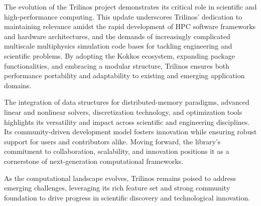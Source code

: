 
The evolution of the Trilinos project demonstrates its critical role in scientific and high-performance computing.
This update underscores Trilinos' dedication to maintaining relevance amidst the rapid development of HPC software frameworks and hardware architectures, and the demands of increasingly complicated multiscale multiphysics simulation code bases for tackling engineering and scientific problems.
By adopting the Kokkos ecosystem, expanding package functionalities, and embracing a modular structure,
Trilinos ensures both performance portability and adaptability to existing and emerging application domains.

The integration of data structures for distributed-memory paradigms, advanced linear and nonlinear solvers, discretization technology, and optimization tools highlights its versatility and impact across scientific and engineering disciplines.
Its community-driven development model fosters innovation while ensuring robust support for users and contributors alike.
Moving forward, the library's commitment to collaboration, scalability, and innovation positions it as a cornerstone of next-generation computational frameworks.

As the computational landscape evolves, Trilinos remains poised to address emerging challenges, leveraging its rich feature set and strong community foundation to drive progress in scientific discovery and technological innovation.